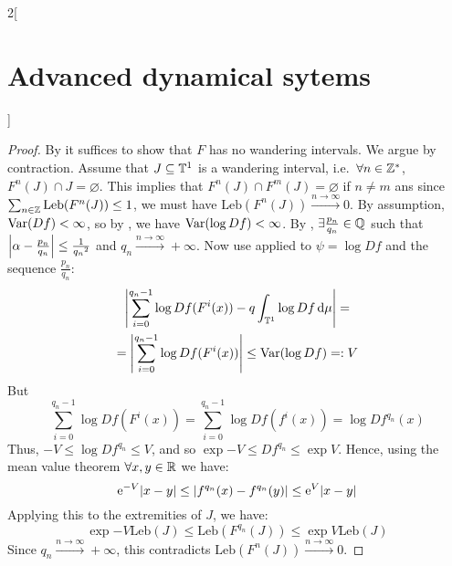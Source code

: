 \documentclass[../../../main_math.tex]{subfiles}
\begin{document}
\begin{multicols}{2}[\section{Advanced dynamical sytems}]
\begin{theorem}
  \end{theorem}
  \begin{proof}
    By  it suffices to show that $F$ has no wandering intervals. We argue by contraction. Assume that $J\subseteq \mathbb{T}^1$ is a wandering interval, i.e.\ $\forall n\in\mathbb{Z}^*$, $F^n(J)\cap J=\varnothing$. This implies that $F^n(J) \cap F^m(J)=\varnothing$ if $n\ne m$ ans since $\sum_{n\in\mathbb{Z}}\text{Leb}(F^n(J))\leq 1$, we must have $\text{Leb}(F^n(J))\overset{n\to\infty}{\longrightarrow}0$. By assumption, $\mathrm{Var}(Df)<\infty$, so by , we have $\mathrm{Var}(\log Df) < \infty$.
    By , $\exists \frac{p_n}{q_n}\in\mathbb{Q}$ such that $\abs{\alpha-\frac{p_n}{q_n}}\leq \frac{1}{{q_n}^2}$ and $q_n\overset{n\to\infty}{\longrightarrow}+\infty$. Now use  applied to $\psi=\log Df$ and the sequence $\frac{p_n}{q_n}$:
    \begin{multline*}
      \abs{\sum_{i=0}^{q_n-1}\log Df(F^i(x))-q\int_{\mathbb{T}^1}\log Df\dd{\mu}}=\\=\abs{\sum_{i=0}^{q_n-1}\log Df(F^i(x))}\leq\mathrm{Var}(\log Df)=:V
    \end{multline*}
    But $$
      \sum_{i=0}^{q_n-1}\log Df(F^i(x))=\sum_{i=0}^{q_n-1}\log Df(f^i(x))=\log Df^{q_n}(x)
    $$
    Thus, $-V\leq \log Df^{q_n}\leq V$, and so $\exp{-V}\leq Df^{q_n}\leq \exp{V}$. Hence, using the mean value theorem $\forall x,y\in\mathbb{R}$ we have:
    $$
      \mathrm{e}^{-V}\abs{x-y}\leq \abs{f^{q_n}(x)-f^{q_n}(y)}\leq\mathrm{e}^{V}\abs{x-y}
    $$
    Applying this to the extremities of $J$, we have:
    $$
      \exp{-V}\text{Leb}(J)\leq \text{Leb}(F^{q_n}(J))\leq \exp{V}\text{Leb}(J)
    $$
    Since $q_n\overset{n\to\infty}{\longrightarrow}+\infty$, this contradicts $\text{Leb}(F^n(J))\overset{n\to\infty}{\longrightarrow}0$.
  \end{proof}
\end{multicols}
\end{document}
